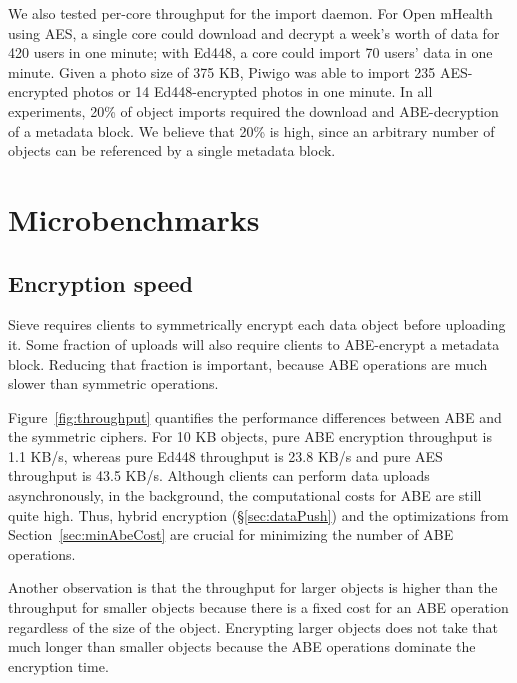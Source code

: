 We also tested per-core throughput for the
import daemon. For Open mHealth using AES,
a single core could download and decrypt a
week's worth of data for 420 users in one
minute; with Ed448, a core could import 70
users' data in one minute. Given a photo
size of 375 KB, Piwigo was able to import
235 AES-encrypted photos or 14 Ed448-encrypted
photos in one minute. In all experiments,
20\% of object imports required the download
and ABE-decryption of a metadata block. We
believe that 20\% is high, since an arbitrary
number of objects can be referenced by a
single metadata block. 

\section{Microbenchmarks}
\label{sec:microbench}
\subsection{Encryption speed} 
Sieve requires
clients to symmetrically encrypt each data
object before uploading it. Some fraction of
uploads will also require clients to
ABE-encrypt a metadata block. Reducing
that fraction is important, because ABE
operations are much slower than symmetric
operations.

Figure~\ref{fig:throughput} quantifies the
performance differences between ABE and
the symmetric ciphers. For 10 KB objects,
pure ABE encryption throughput is 1.1 KB/s,
whereas pure Ed448 throughput is 23.8 KB/s
and pure AES throughput is 43.5 KB/s.
Although clients can perform data uploads
asynchronously, in the background, the
computational costs for ABE are still quite
high. Thus, hybrid encryption (\S\ref{sec:dataPush})
and the optimizations from Section~\ref{sec:minAbeCost}
are crucial for minimizing the number of
ABE operations.

Another observation is that the throughput for
larger objects is higher than the
throughput for smaller objects because
there is a fixed cost for an ABE operation regardless
of the size of the object. Encrypting larger objects
does not take that much longer than smaller
objects because the ABE operations dominate 
the encryption time.

